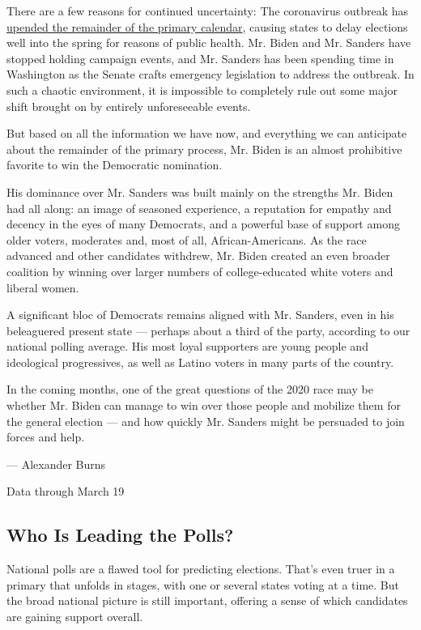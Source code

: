 There are a few reasons for continued uncertainty: The coronavirus
outbreak has
\href{https://www.nytimes3xbfgragh.onion/article/2020-campaign-primary-calendar-coronavirus.html}{upended
the remainder of the primary calendar}, causing states to delay
elections well into the spring for reasons of public health. Mr. Biden
and Mr. Sanders have stopped holding campaign events, and Mr. Sanders
has been spending time in Washington as the Senate crafts emergency
legislation to address the outbreak. In such a chaotic environment, it
is impossible to completely rule out some major shift brought on by
entirely unforeseeable events.

But based on all the information we have now, and everything we can
anticipate about the remainder of the primary process, Mr. Biden is an
almost prohibitive favorite to win the Democratic nomination.

His dominance over Mr. Sanders was built mainly on the strengths Mr.
Biden had all along: an image of seasoned experience, a reputation for
empathy and decency in the eyes of many Democrats, and a powerful base
of support among older voters, moderates and, most of all,
African-Americans. As the race advanced and other candidates withdrew,
Mr. Biden created an even broader coalition by winning over larger
numbers of college-educated white voters and liberal women.

A significant bloc of Democrats remains aligned with Mr. Sanders, even
in his beleaguered present state --- perhaps about a third of the party,
according to our national polling average. His most loyal supporters are
young people and ideological progressives, as well as Latino voters in
many parts of the country.

In the coming months, one of the great questions of the 2020 race may be
whether Mr. Biden can manage to win over those people and mobilize them
for the general election --- and how quickly Mr. Sanders might be
persuaded to join forces and help.

--- Alexander Burns

Data through March 19

\hypertarget{who-is-leading-the-polls}{%
\subsection{Who Is Leading the Polls?}\label{who-is-leading-the-polls}}

National polls are a flawed tool for predicting elections. That's even
truer in a primary that unfolds in stages, with one or several states
voting at a time. But the broad national picture is still important,
offering a sense of which candidates are gaining support overall.


